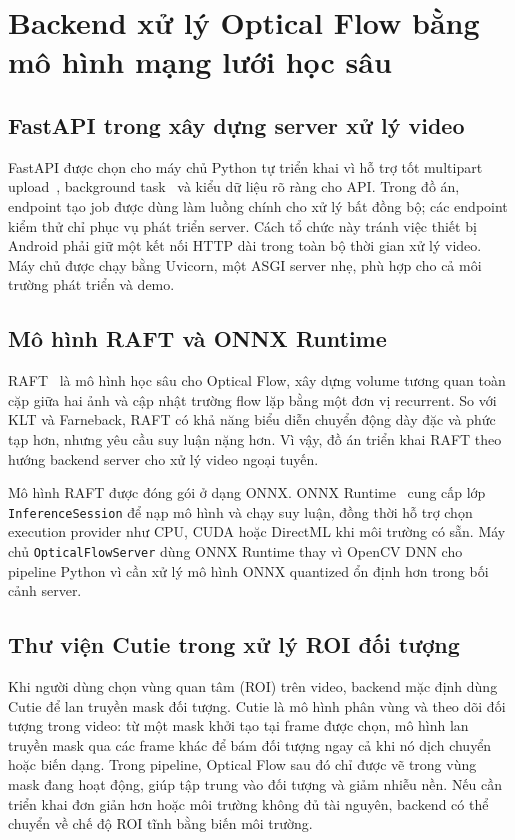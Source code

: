 \documentclass[../DoAn.tex]{subfiles}
\begin{document}
\section{Backend xử lý Optical Flow bằng mô hình mạng lưới học sâu}
\label{section:3.5}
\subsection{FastAPI trong xây dựng server xử lý video}
\label{subsection:3.5.1}
FastAPI được chọn cho máy chủ Python tự triển khai vì hỗ trợ tốt multipart upload~\cite{fastapi-upload}, background task~\cite{fastapi-background} và kiểu dữ liệu rõ ràng cho API. Trong đồ án, endpoint tạo job được dùng làm luồng chính cho xử lý bất đồng bộ; các endpoint kiểm thử chỉ phục vụ phát triển server. Cách tổ chức này tránh việc thiết bị Android phải giữ một kết nối HTTP dài trong toàn bộ thời gian xử lý video. Máy chủ được chạy bằng Uvicorn, một ASGI server nhẹ, phù hợp cho cả môi trường phát triển và demo.

\subsection{Mô hình RAFT và ONNX Runtime}
\label{subsection:3.5.2}
RAFT~\cite{raft2020} là mô hình học sâu cho Optical Flow, xây dựng volume tương quan toàn cặp giữa hai ảnh và cập nhật trường flow lặp bằng một đơn vị recurrent. So với KLT và Farneback, RAFT có khả năng biểu diễn chuyển động dày đặc và phức tạp hơn, nhưng yêu cầu suy luận nặng hơn. Vì vậy, đồ án triển khai RAFT theo hướng backend server cho xử lý video ngoại tuyến.

Mô hình RAFT được đóng gói ở dạng ONNX. ONNX Runtime~\cite{onnxruntime-python-api} cung cấp lớp \texttt{InferenceSession} để nạp mô hình và chạy suy luận, đồng thời hỗ trợ chọn execution provider như CPU, CUDA hoặc DirectML khi môi trường có sẵn. Máy chủ \texttt{OpticalFlowServer} dùng ONNX Runtime thay vì OpenCV DNN cho pipeline Python vì cần xử lý mô hình ONNX quantized ổn định hơn trong bối cảnh server.

\subsection{Thư viện Cutie trong xử lý ROI đối tượng}
\label{subsection:3.5.3}
Khi người dùng chọn vùng quan tâm (ROI) trên video, backend mặc định dùng Cutie để lan truyền mask đối tượng. Cutie là mô hình phân vùng và theo dõi đối tượng trong video: từ một mask khởi tạo tại frame được chọn, mô hình lan truyền mask qua các frame khác để bám đối tượng ngay cả khi nó dịch chuyển hoặc biến dạng. Trong pipeline, Optical Flow sau đó chỉ được vẽ trong vùng mask đang hoạt động, giúp tập trung vào đối tượng và giảm nhiễu nền. Nếu cần triển khai đơn giản hơn hoặc môi trường không đủ tài nguyên, backend có thể chuyển về chế độ ROI tĩnh bằng biến môi trường.
\end{document}
